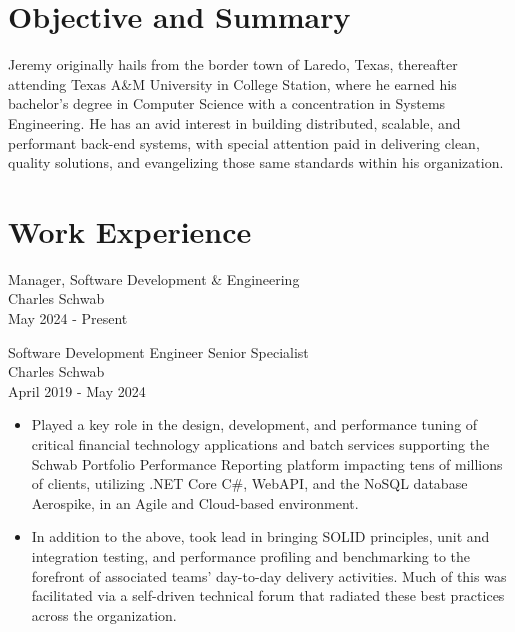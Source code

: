 \documentclass[11pt]{res} %
\begin{document}
 
 

\address{{\bf Current Address} \\   2912 Sebring Circle \\   Austin, TX
         78747  \\ (956)286-8386}
\address{{\bf Contact Information} \\ jeremycantu.com \\ github.com/jac21 \\ mail@jeremycantu.com}
 
                                             
\begin{resume}
                                               
 
\section{Objective and Summary}
   Jeremy originally hails from the border town of Laredo, Texas, thereafter attending Texas A\&M University in College Station, where he earned his bachelor's degree in Computer Science with a concentration in Systems Engineering. He has an avid interest in building distributed, scalable, and performant back-end systems, with special attention paid in delivering clean, quality solutions, and evangelizing those same standards within his organization.
 
\section{Work Experience}

Manager, Software Development \& Engineering \\
Charles Schwab \\
May 2024 - Present

Software Development Engineer Senior Specialist \\
Charles Schwab \\
April 2019 - May 2024
\vspace{0.2in}
   \begin{itemize} \itemsep -2pt  %
   \item Played a key role in the design, development, and performance tuning of critical financial technology applications and batch services supporting the Schwab Portfolio Performance Reporting platform impacting tens of millions of clients, utilizing .NET Core C\#, WebAPI, and the NoSQL database Aerospike, in an Agile and Cloud-based environment. 
\newline
    \item In addition to the above, took lead in bringing SOLID principles, unit and integration testing, and performance profiling and benchmarking to the forefront of associated teams' day-to-day delivery activities. Much of this was facilitated via a self-driven technical forum that radiated these best practices across the organization.
 \end{itemize}


\end{resume}
\end{document}
